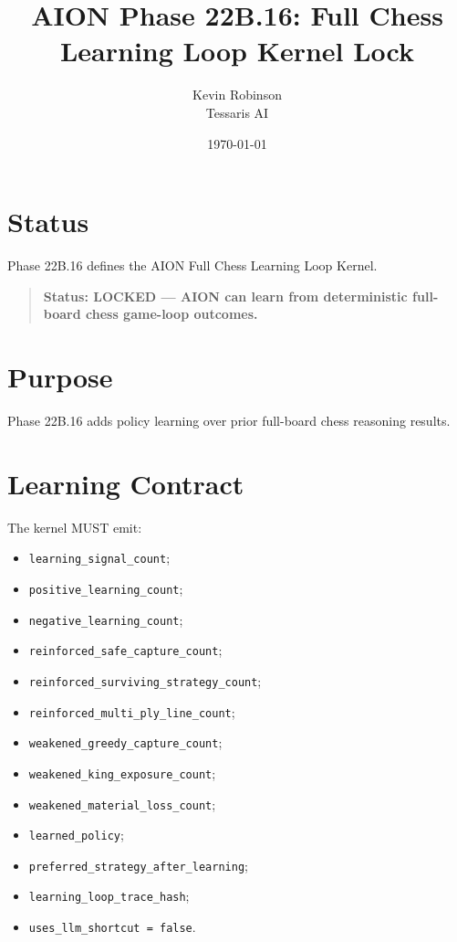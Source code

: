 \documentclass[11pt,a4paper]{article}
\title{\textbf{AION Phase 22B.16: Full Chess Learning Loop Kernel Lock}}
\author{Kevin Robinson\\Tessaris AI}
\date{\today}
\begin{document}
\maketitle

\section{Status}

Phase 22B.16 defines the AION Full Chess Learning Loop Kernel.

\begin{quote}
\textbf{Status: LOCKED --- AION can learn from deterministic full-board chess game-loop outcomes.}
\end{quote}

\section{Purpose}

Phase 22B.16 adds policy learning over prior full-board chess reasoning results.

\section{Learning Contract}

The kernel MUST emit:

\begin{itemize}
  \item \texttt{learning\_signal\_count};
  \item \texttt{positive\_learning\_count};
  \item \texttt{negative\_learning\_count};
  \item \texttt{reinforced\_safe\_capture\_count};
  \item \texttt{reinforced\_surviving\_strategy\_count};
  \item \texttt{reinforced\_multi\_ply\_line\_count};
  \item \texttt{weakened\_greedy\_capture\_count};
  \item \texttt{weakened\_king\_exposure\_count};
  \item \texttt{weakened\_material\_loss\_count};
  \item \texttt{learned\_policy};
  \item \texttt{preferred\_strategy\_after\_learning};
  \item \texttt{learning\_loop\_trace\_hash};
  \item \texttt{uses\_llm\_shortcut = false}.
\end{itemize}
\end{document}
